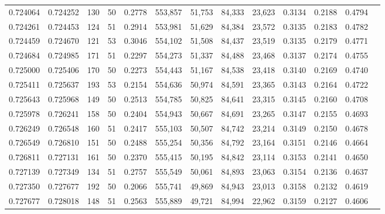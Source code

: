 \begin{tabular}{rrrrrrrrrrrrr}
0.724064 & 0.724252 &   130 &  50 &                                     0.2778 & 553,857 &  51,753 &  84,333 &  23,623 & 0.3134 & 0.2188 & 0.4794 \\
0.724261 & 0.724453 &   124 &  51 &                                     0.2914 & 553,981 &  51,629 &  84,384 &  23,572 & 0.3135 & 0.2183 & 0.4782 \\
0.724459 & 0.724670 &   121 &  53 &                                     0.3046 & 554,102 &  51,508 &  84,437 &  23,519 & 0.3135 & 0.2179 & 0.4771 \\
0.724684 & 0.724985 &   171 &  51 &                                     0.2297 & 554,273 &  51,337 &  84,488 &  23,468 & 0.3137 & 0.2174 & 0.4755 \\
0.725000 & 0.725406 &   170 &  50 &                                     0.2273 & 554,443 &  51,167 &  84,538 &  23,418 & 0.3140 & 0.2169 & 0.4740 \\
0.725411 & 0.725637 &   193 &  53 &                                     0.2154 & 554,636 &  50,974 &  84,591 &  23,365 & 0.3143 & 0.2164 & 0.4722 \\
0.725643 & 0.725968 &   149 &  50 &                                     0.2513 & 554,785 &  50,825 &  84,641 &  23,315 & 0.3145 & 0.2160 & 0.4708 \\
0.725978 & 0.726241 &   158 &  50 &                                     0.2404 & 554,943 &  50,667 &  84,691 &  23,265 & 0.3147 & 0.2155 & 0.4693 \\
0.726249 & 0.726548 &   160 &  51 &                                     0.2417 & 555,103 &  50,507 &  84,742 &  23,214 & 0.3149 & 0.2150 & 0.4678 \\
0.726549 & 0.726810 &   151 &  50 &                                     0.2488 & 555,254 &  50,356 &  84,792 &  23,164 & 0.3151 & 0.2146 & 0.4664 \\
0.726811 & 0.727131 &   161 &  50 &                                     0.2370 & 555,415 &  50,195 &  84,842 &  23,114 & 0.3153 & 0.2141 & 0.4650 \\
0.727139 & 0.727349 &   134 &  51 &                                     0.2757 & 555,549 &  50,061 &  84,893 &  23,063 & 0.3154 & 0.2136 & 0.4637 \\
0.727350 & 0.727677 &   192 &  50 &                                     0.2066 & 555,741 &  49,869 &  84,943 &  23,013 & 0.3158 & 0.2132 & 0.4619 \\
0.727677 & 0.728018 &   148 &  51 &                                     0.2563 & 555,889 &  49,721 &  84,994 &  22,962 & 0.3159 & 0.2127 & 0.4606 \\

\end{tabular}
